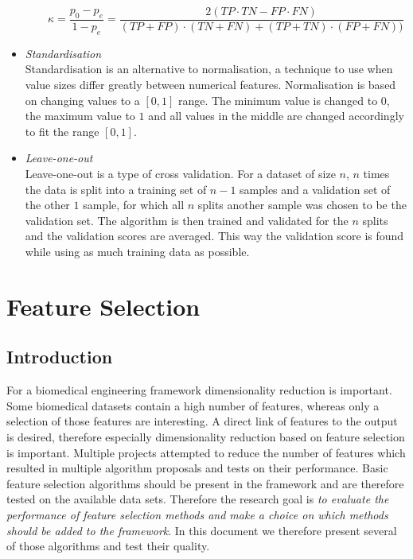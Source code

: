 \documentclass[10pt,a4paper]{report}
\begin{document}
\begin{itemize}
\begin{itemize}
			\begin{equation}\label{eq:Kappa}
			\kappa = \frac{p_0 - p_e}{1 - p_e} = \frac{2(TP \cdot TN - FP \cdot FN)}{(TP + FP) \cdot (TN + FN) + (TP + TN) \cdot (FP + FN))}
			\end{equation} 
		\end{itemize}
		\item \textit{Standardisation} \\
		Standardisation is an alternative to normalisation, a technique to use when value sizes differ greatly between numerical features. Normalisation is based on changing values to a $[0, 1] $ range. The minimum value is changed to $0$, the maximum value to $1$ and all values in the middle are changed accordingly to fit the range $[0, 1]$. 
		\item \textit{Leave-one-out} \\
		Leave-one-out is a type of cross validation. For a dataset of size $n$, $n$ times the data is split into a training set of $n-1$ samples and a validation set of the other $1$ sample, for which all $n$ splits another sample was chosen to be the validation set. The algorithm is then trained and validated for the $n$ splits and the validation scores are averaged. This way the validation score is found while using as much training data as possible\cite{kearns1999algorithmic}.
	\end{itemize}
	
	
	\chapter{Feature Selection}
	\label{chap:FeatureSelection}
	
	\section{Introduction}
	\label{FSsec:Introduction}
	
	For a biomedical engineering framework dimensionality reduction is important.  Some biomedical datasets contain a high number of features, whereas only a selection of those features are interesting. A direct link of features to the output is desired, therefore especially dimensionality reduction based on feature selection is important. Multiple projects attempted to reduce the number of features\cite{baumgartner2006data, welthagen2005comprehensive} which resulted in multiple algorithm proposals\cite{lim2003planar, peng2010novel, biesiada2007feature, ding2005minimum} and tests on their performance\cite{catal2009investigating, liu2002comparative}. Basic feature selection algorithms should be present in the framework and are therefore tested on the available data sets. Therefore the research goal is \emph{to evaluate the performance of feature selection methods and make a choice on which methods should be added to the framework}. In this document we therefore present several of those algorithms and test their quality.
	
\end{document}
